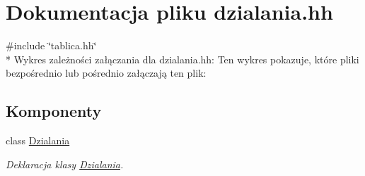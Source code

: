 \hypertarget{dzialania_8hh}{\section{Dokumentacja pliku dzialania.\-hh}
\label{dzialania_8hh}
}
{\ttfamily \#include \char`\"{}tablica.\-hh\char`\"{}}\\*
Wykres zależności załączania dla dzialania.\-hh\-:
Ten wykres pokazuje, które pliki bezpośrednio lub pośrednio załączają ten plik\-:
\subsection*{Komponenty}
\begin{DoxyCompactItemize}
\item 
class \hyperlink{class_dzialania}{Dzialania}
\begin{DoxyCompactList}\small\item\em Deklaracja klasy \hyperlink{class_dzialania}{Dzialania}. \end{DoxyCompactList}\end{DoxyCompactItemize}
